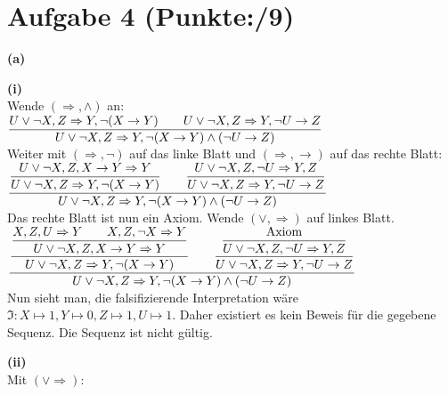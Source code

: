 \documentclass[11pt, a4paper]{article}
\newcommand{\ppp}{9}
\begin{document}
\section*{Aufgabe 4 (Punkte:\qquad/\ppp)}
\textbf{(a)}
\begin{adjustwidth}{20pt}{20pt}
\textbf{(i)}\\

Wende $(\Rightarrow,\wedge)$ an:\\

$
\dfrac
{U\vee \neg X,Z \Rightarrow Y,\neg (X \rightarrow Y) \text{\qquad} U\vee \neg X,Z \Rightarrow Y,\neg U \rightarrow Z}
{U\vee \neg X,Z \Rightarrow Y,\neg (X \rightarrow Y)\wedge (\neg U \rightarrow Z)}
$\\

Weiter mit $(\Rightarrow, \neg)$ auf das linke Blatt und $(\Rightarrow, \rightarrow)$  auf das rechte Blatt:\\ 

$
\dfrac
{\dfrac{U\vee \neg X,Z,X \rightarrow Y \Rightarrow Y}{U\vee \neg X,Z \Rightarrow Y,\neg (X \rightarrow Y)} \text{\qquad} \dfrac{U\vee \neg X,Z,\neg U \Rightarrow Y,Z}{U\vee \neg X,Z \Rightarrow Y,\neg U \rightarrow Z}}
{U\vee \neg X,Z \Rightarrow Y,\neg (X \rightarrow Y)\wedge (\neg U \rightarrow Z)}
$\\

Das rechte Blatt ist nun ein Axiom. Wende $(\vee, \Rightarrow)$ auf linkes Blatt.\\

$
\dfrac
{\dfrac{
		\dfrac
		{X,Z,U \Rightarrow Y \text{\qquad}  X,Z,\neg X \Rightarrow Y}
		{U\vee \neg X,Z,X \rightarrow Y \Rightarrow Y}}
{U\vee \neg X,Z \Rightarrow Y,\neg (X \rightarrow Y)} \text{\qquad} \dfrac
	{	\dfrac
		{\text{Axiom}}
		{U\vee \neg X,Z,\neg U \Rightarrow Y,Z}}
	{U\vee \neg X,Z \Rightarrow Y,\neg U \rightarrow Z}}
{U\vee \neg X,Z \Rightarrow Y,\neg (X \rightarrow Y)\wedge (\neg U \rightarrow Z)}
$\\

Nun sieht man, die falsifizierende Interpretation wäre $\mathfrak{I}: X \mapsto 1, Y \mapsto 0, Z \mapsto 1, U \mapsto 1$. Daher existiert es kein Beweis für die gegebene Sequenz. Die Sequenz ist nicht gültig.\\
\vspace*{35pt}

\textbf{(ii)}\\

Mit $(\vee \Rightarrow)$:\\


\end{adjustwidth}
\end{document}
